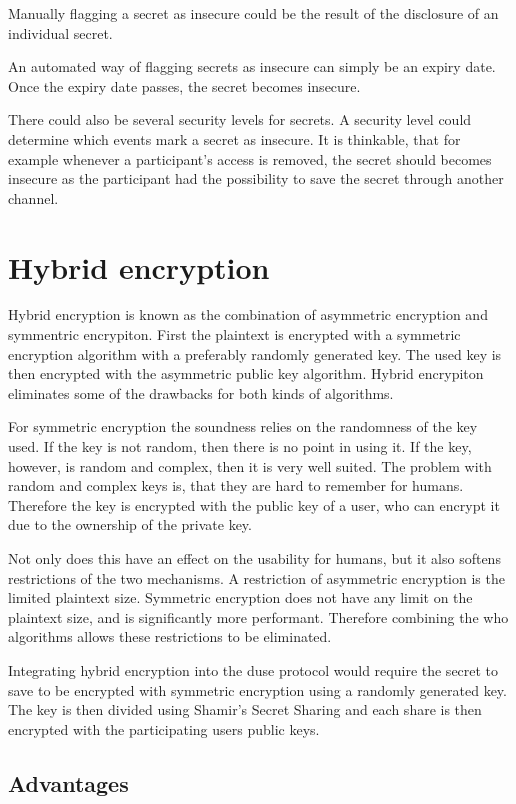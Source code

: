 Manually flagging a secret as insecure could be the result of the disclosure of
an individual secret.

An automated way of flagging secrets as insecure can simply be an expiry date.
Once the expiry date passes, the secret becomes insecure.

There could also be several security levels for secrets. A security level could
determine which events mark a secret as insecure. It is thinkable, that for
example whenever a participant's access is removed, the secret should becomes
insecure as the participant had the possibility to save the secret through
another channel.

\section{Hybrid encryption}

Hybrid encryption is known as the combination of asymmetric encryption and
symmentric encrypiton. First the plaintext is encrypted with a symmetric
encryption algorithm with a preferably randomly generated key. The used key is
then encrypted with the asymmetric public key algorithm. Hybrid encrypiton
eliminates some of the drawbacks for both kinds of algorithms.

For symmetric encryption the soundness relies on the randomness of the key
used. If the key is not random, then there is no point in using it. If the key,
however, is random and complex, then it is very well suited. The problem with
random and complex keys is, that they are hard to remember for humans.
Therefore the key is encrypted with the public key of a user, who can encrypt
it due to the ownership of the private key.

Not only does this have an effect on the usability for humans, but it also
softens restrictions of the two mechanisms. A restriction of asymmetric
encryption is the limited plaintext size. Symmetric encryption does not have
any limit on the plaintext size, and is significantly more performant.
Therefore combining the who algorithms allows these restrictions to be
eliminated.

Integrating hybrid encryption into the duse protocol would require the secret
to save to be encrypted with symmetric encryption using a randomly generated
key. The key is then divided using Shamir's Secret Sharing and each share is
then encrypted with the participating users public keys.

\subsection{Advantages}

